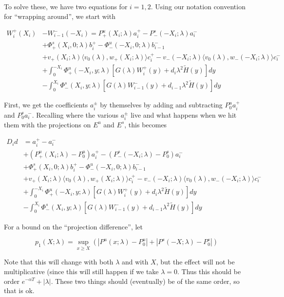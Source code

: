 \documentclass[12pt]{article}
\begin{document}
\begin{enumerate}
To solve these, we have two equations for $i = 1, 2$. Using our notation convention for ``wrapping around'', we start with

\begin{align*}
W_i^+(X_i) &- W_{i-1}^-(-X_i) = P^u_+(X_i; \lambda) a_i^+ - P^s_-(-X_i; \lambda) a_i^- \\
&+ \Phi^s_+(X_i, 0; \lambda)b_i^+ - \Phi^u_-(-X_i, 0; \lambda)b_{i-1}^- \\
&+ v_+(X_i; \lambda) \langle v_0(\lambda), w_+(X_i; \lambda) \rangle c_i^+ - v_-(-X_i; \lambda) \langle v_0(\lambda), w_-(-X_i; \lambda) \rangle c_i^- \\
&+ \int_0^{-X_i} \Phi^u_+(-X_i, y; \lambda) [ G(\lambda)W_i^+(y) + d_i \lambda^2 \tilde{H}(y) ] dy \\
&- \int_0^{X_i} \Phi^s_-(X_i, y; \lambda) [ G(\lambda)W_{i-1}^-(y) + d_{i-1} \lambda^2 \tilde{H}(y) ] dy
\end{align*}

First, we get the coefficients $a_i^\pm$ by themselves by adding and subtracting $P_0^u a_i^+$ and $P_0^s a_i^-$. Recalling where the various $a_i^\pm$ live and what happens when we hit them with the projections on $E^u$ and $E^s$, this becomes

\begin{align*}
D_i d &= a_i^+ - a_i^- \\
&+ (P^u_+(X_i; \lambda) - P_0^u)a_i^+ - (P^s_-(-X_i; \lambda) - P_0^s)a_i^- \\
&+ \Phi^s_+(X_i, 0; \lambda)b_i^+ - \Phi^u_-(-X_i, 0; \lambda)b_{i-1}^- \\
&+ v_+(X_i; \lambda) \langle v_0(\lambda), w_+(X_i; \lambda) \rangle c_i^+ - v_-(-X_i; \lambda) \langle v_0(\lambda), w_-(-X_i; \lambda) \rangle c_i^- \\
&+ \int_0^{-X_i} \Phi^u_+(-X_i, y; \lambda) [ G(\lambda)W_i^+(y) + d_i \lambda^2 \tilde{H}(y) ] dy \\
&- \int_0^{X_i} \Phi^s_-(X_i, y; \lambda) [ G(\lambda)W_{i-1}^-(y) + d_{i-1} \lambda^2 \tilde{H}(y) ] dy
\end{align*}

For a bound on the ``projection difference'', let

\[
p_1(X;\lambda) = \sup_{x \geq X} (|P^u(x;\lambda) - P_0^u| + |P^s(-X;\lambda) - P_0^s|)
\]

Note that this will change with both $\lambda$ and with $X$, but the effect will not be multiplicative (since this will still happen if we take $\lambda = 0$. Thus this should be order $e^{-\alpha T} + |\lambda|$. These two things should (eventually) be of the same order, so that is ok.
\\


\end{enumerate}
\end{document}
